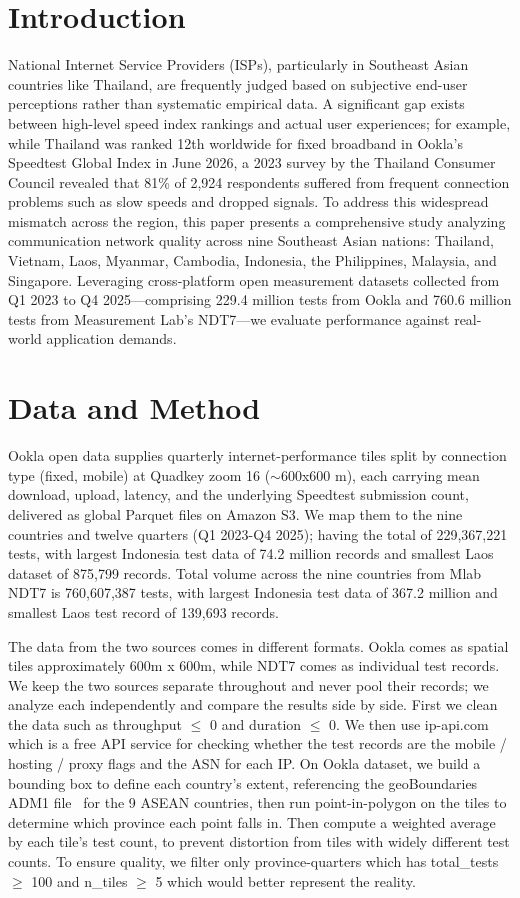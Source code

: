 \documentclass[sigconf,nonacm]{acmart}
\begin{document}
\section{Introduction}
National Internet Service Providers (ISPs), particularly in Southeast Asian
countries like Thailand, are frequently judged based on subjective end-user
perceptions rather than systematic empirical data. A significant gap exists
between high-level speed index rankings and actual user experiences; for
example, while Thailand was ranked 12th worldwide for fixed broadband in
Ookla's Speedtest Global Index in June 2026, a 2023 survey by the Thailand
Consumer Council revealed that 81\% of 2,924 respondents suffered from
frequent connection problems such as slow speeds and dropped signals. To
address this widespread mismatch across the region, this paper presents a
comprehensive study analyzing communication network quality across nine
Southeast Asian nations: Thailand, Vietnam, Laos, Myanmar, Cambodia,
Indonesia, the Philippines, Malaysia, and Singapore. Leveraging
cross-platform open measurement datasets collected from Q1 2023 to Q4
2025---comprising 229.4 million tests from Ookla and 760.6 million tests
from Measurement Lab's NDT7---we evaluate performance against real-world
application demands.

\section{Data and Method}
Ookla open data supplies quarterly internet-performance tiles split by
connection type (fixed, mobile) at Quadkey zoom 16 ($\sim$600x600 m), each
carrying mean download, upload, latency, and the underlying Speedtest
submission count, delivered as global Parquet files on Amazon S3. We map
them to the nine countries and twelve quarters (Q1 2023-Q4 2025); having
the total of 229,367,221 tests, with largest Indonesia test data of 74.2
million records and smallest Laos dataset of 875,799 records. Total volume
across the nine countries from Mlab NDT7 is 760,607,387 tests, with
largest Indonesia test data of 367.2 million and smallest Laos test record
of 139,693 records.

The data from the two sources comes in different formats. Ookla comes as
spatial tiles approximately 600m x 600m, while NDT7 comes as individual
test records. We keep the two sources separate throughout and never pool
their records; we analyze each independently and compare the results side
by side. First we clean the data such as throughput $\leq$ 0 and duration
$\leq$ 0.
We then use ip-api.com~\cite{IpApi} which is a free API service for
checking whether the test records are the mobile / hosting / proxy flags
and the ASN for each IP. On Ookla dataset, we build a bounding box to
define each country's extent, referencing the geoBoundaries ADM1
file~\cite{Runfola2020} for the 9 ASEAN countries, then run
point-in-polygon on the tiles to determine which province each point falls
in. Then compute a weighted average by each tile's test count, to prevent
distortion from tiles with widely different test counts. To ensure
quality, we filter only province-quarters which has total\_tests $\geq$
100 and n\_tiles $\geq$ 5 which would better represent the reality.
\end{document}
